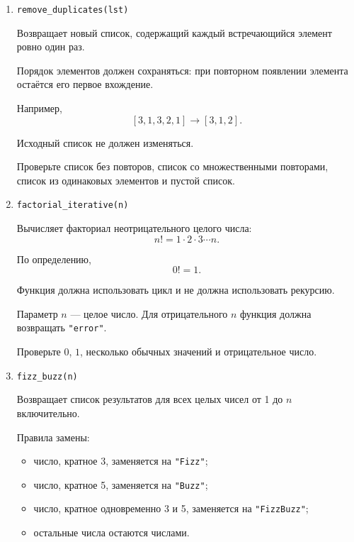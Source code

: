 \begin{enumerate}
Сравнение выполняется посимвольно с учётом регистра и пробелов.
Например, \texttt{"level"} является палиндромом, а
\texttt{"Level"} --- нет.

Пустая строка и строка из одного символа считаются палиндромами.

Проверьте палиндромы чётной и нечётной длины, непалиндромные строки,
строку из одного символа и пустую строку.

\item \texttt{remove\_duplicates(lst)}

Возвращает новый список, содержащий каждый встречающийся элемент
ровно один раз.

Порядок элементов должен сохраняться: при повторном появлении элемента
остаётся его первое вхождение.

Например,
\[
[3,1,3,2,1] \rightarrow [3,1,2].
\]

Исходный список не должен изменяться.

Проверьте список без повторов, список со множественными повторами,
список из одинаковых элементов и пустой список.

\item \texttt{factorial\_iterative(n)}

Вычисляет факториал неотрицательного целого числа:
\[
n! = 1\cdot2\cdot3\cdots n.
\]

По определению,
\[
0! = 1.
\]

Функция должна использовать цикл и не должна использовать рекурсию.

Параметр $n$ --- целое число. Для отрицательного $n$ функция должна
возвращать \texttt{"error"}.

Проверьте $0$, $1$, несколько обычных значений и отрицательное число.

\item \texttt{fizz\_buzz(n)}

Возвращает список результатов для всех целых чисел от 1 до $n$ включительно.

Правила замены:
\begin{itemize}
    \item число, кратное 3, заменяется на \texttt{"Fizz"};
    \item число, кратное 5, заменяется на \texttt{"Buzz"};
    \item число, кратное одновременно 3 и 5, заменяется на
    \texttt{"FizzBuzz"};
    \item остальные числа остаются числами.
\end{itemize}


\end{enumerate}

